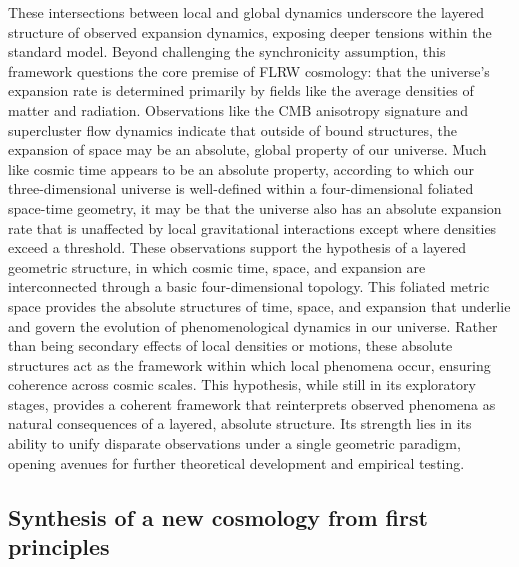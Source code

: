 \documentclass[aps,rmp,groupedaddress,twocolumn,10pt]{revtex4-2}
\begin{document}
These intersections between local and global dynamics underscore the layered structure of observed expansion dynamics, exposing deeper tensions within the standard model. Beyond challenging the synchronicity assumption, this framework questions the core premise of FLRW cosmology: that the universe's expansion rate is determined primarily by fields like the average densities of matter and radiation. Observations like the CMB anisotropy signature and supercluster flow dynamics indicate that outside of bound structures, the expansion of space may be an absolute, global property of our universe. Much like cosmic time appears to be an absolute property, according to which our three-dimensional universe is well-defined within a four-dimensional foliated space-time geometry, it may be that the universe also has an absolute expansion rate that is unaffected by local gravitational interactions except where densities exceed a threshold. These observations support the hypothesis of a layered geometric structure, in which cosmic time, space, and expansion are interconnected through a basic four-dimensional topology. This foliated metric space provides the absolute structures of time, space, and expansion that underlie and govern the evolution of phenomenological dynamics in our universe. Rather than being secondary effects of local densities or motions, these absolute structures act as the framework within which local phenomena occur, ensuring coherence across cosmic scales. This hypothesis, while still in its exploratory stages, provides a coherent framework that reinterprets observed phenomena as natural consequences of a layered, absolute structure. Its strength lies in its ability to unify disparate observations under a single geometric paradigm, opening avenues for further theoretical development and empirical testing.

\subsection{Synthesis of a new cosmology from first principles}\label{sec:cosmo_synth}
\end{document}
